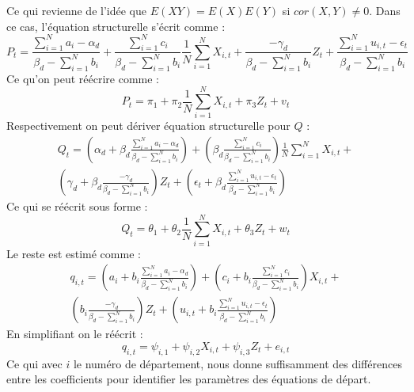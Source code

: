 \documentclass[11pt, a4paper]{article}
\begin{document}
Ce qui revienne de l'idée que $E(XY) = E(X)E(Y)$ si $cor(X,Y) \neq 0$.
Dans ce cas, l'équation structurelle s'écrit comme :
\begin{equation}
  P_t = \frac{\sum_{i = 1}^{N} a_i - \alpha_d}{\beta_d - \sum_{i = 1}^{N} b_i} + 
      \frac{\sum_{i = 1}^{N} c_i}{\beta_d - \sum_{i = 1}^{N} b_i} \frac{1}{N} \sum_{i = 1}^{N} X_{i,t} +
      \frac{-\gamma_d}{\beta_d - \sum_{i = 1}^{N} b_i} Z_t + 
      \frac{\sum_{i = 1}^{N} u_{i,t} - \epsilon_t}{\beta_d - \sum_{i = 1}^{N} b_i}
\end{equation}
Ce qu'on peut réécrire comme :
\begin{equation}
  P_t = \pi_1 + 
      \pi_2 \frac{1}{N} \sum_{i = 1}^{N} X_{i,t} +
      \pi_3 Z_t + 
      v_t
\end{equation}
Respectivement on peut dériver équation structurelle pour $Q$ :
\begin{multline}
    Q_t = (\alpha_d + \beta_d \frac{\sum_{i = 1}^{N} a_i - \alpha_d}{\beta_d - \sum_{i = 1}^{N} b_i}) + 
        (\beta_d \frac{\sum_{i = 1}^{N} c_i}{\beta_d - \sum_{i = 1}^{N} b_i}) \frac{1}{N} \sum_{i = 1}^{N} X_{i,t} + \\
        (\gamma_d + \beta_d \frac{-\gamma_d}{\beta_d - \sum_{i = 1}^{N} b_i}) Z_t + 
        (\epsilon_t + \beta_d \frac{\sum_{i = 1}^{N} u_{i,t} - \epsilon_t}{\beta_d - \sum_{i = 1}^{N} b_i})
\end{multline}
Ce qui se réécrit sous forme :
\begin{equation}
  Q_t = \theta_1 + 
      \theta_2 \frac{1}{N} \sum_{i = 1}^{N} X_{i,t} +
      \theta_3 Z_t + 
      w_t
\end{equation}
Le reste est estimé comme :
\begin{multline}
  q_{i,t} = (a_i + b_i \frac{\sum_{i = 1}^{N} a_i - \alpha_d}{\beta_d - \sum_{i = 1}^{N} b_i}) + 
      (c_i + b_i \frac{\sum_{i = 1}^{N} c_i}{\beta_d - \sum_{i = 1}^{N} b_i}) X_{i,t} + \\
      (b_i \frac{-\gamma_d}{\beta_d - \sum_{i = 1}^{N} b_i}) Z_t + 
      (u_{i,t} + b_i \frac{\sum_{i = 1}^{N} u_{i,t} - \epsilon_t}{\beta_d - \sum_{i = 1}^{N} b_i})
\end{multline}
En simplifiant on le réécrit : 
\begin{equation}
  q_{i,t} = \psi_{i,1} + 
      \psi_{i,2} X_{i,t} +
      \psi_{i,3} Z_t + 
      e_{i,t}
\end{equation}
Ce qui avec $i$ le numéro de département, nous donne suffisamment des différences entre les coefficients pour identifier les paramètres des équations de départ. 
\end{document}
